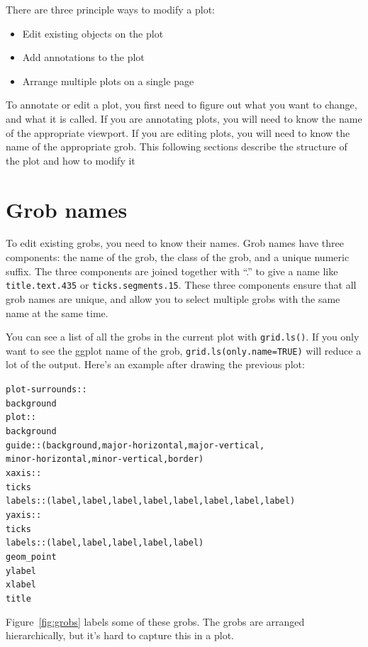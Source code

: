 There are three principle ways to modify a plot:

\begin{itemize}
  \item Edit existing objects on the plot
  \item Add annotations to the plot
  \item Arrange multiple plots on a single page
\end{itemize}

To annotate or edit a plot, you first need to figure out what you want to change, and what it is called.  If you are annotating plots, you will need to know the name of the appropriate viewport.  If you are editing plots, you will need to know the name of the appropriate grob.  This following sections describe the structure of the plot and how to modify it


\section{Grob names}

To edit existing grobs, you need to know their names.  Grob names have three components: the name of the grob, the class of the grob, and a unique numeric suffix.  The three components are joined together with ``.'' to give a name like {\tt title.text.435} or {\tt ticks.segments.15}.  These three components ensure that all grob names are unique, and allow you to select multiple grobs with the same name at the same time.

You can see a list of all the grobs in the current plot with {\tt grid.ls()}.  If you only want to see the ggplot name of the grob, {\tt grid.ls(only.name=TRUE)} will reduce a lot of the output.  Here's an example after drawing the previous plot:

\begin{alltt}
plot-surrounds::
 background
 plot::
  background
  guide:: (background, major-horizontal, major-vertical, 
           minor-horizontal, minor-vertical, border)
  xaxis::
   ticks
   labels:: (label, label, label, label, label, label, label, label)
  yaxis::
   ticks
   labels:: (label, label, label, label, label)
  geom_point
 ylabel
 xlabel
 title
\end{alltt}

Figure~\ref{fig:grobs} labels some of these grobs.  The grobs are arranged hierarchically, but it's hard to capture this in a plot.

